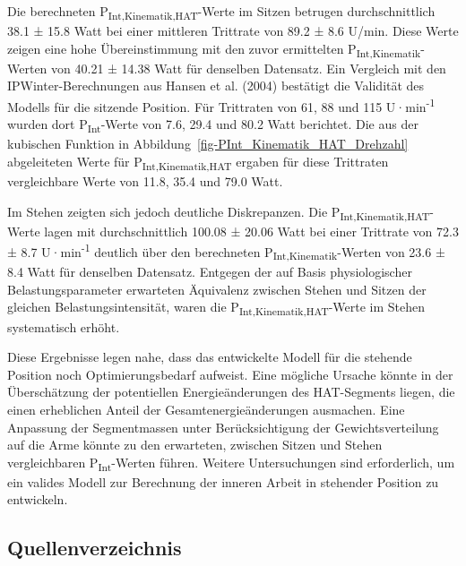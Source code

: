 \documentclass[
  letterpaper,
  DIV=11]{scrartcl}
\begin{document}
Die berechneten P\textsubscript{Int,Kinematik,HAT}-Werte im Sitzen
betrugen durchschnittlich 38.1 ± 15.8 Watt bei einer mittleren Trittrate
von 89.2 ± 8.6 U/min. Diese Werte zeigen eine hohe Übereinstimmung mit
den zuvor ermittelten P\textsubscript{Int,Kinematik}-Werten von 40.21 ±
14.38 Watt für denselben Datensatz. Ein Vergleich mit den
IPWinter-Berechnungen aus Hansen et al. (2004) bestätigt die Validität
des Modells für die sitzende Position. Für Trittraten von 61, 88 und 115
U·min\textsuperscript{-1} wurden dort P\textsubscript{Int}-Werte von
7.6, 29.4 und 80.2 Watt berichtet. Die aus der kubischen Funktion in
Abbildung~\ref{fig-PInt_Kinematik_HAT_Drehzahl} abgeleiteten Werte für
P\textsubscript{Int,Kinematik,HAT} ergaben für diese Trittraten
vergleichbare Werte von 11.8, 35.4 und 79.0 Watt.

Im Stehen zeigten sich jedoch deutliche Diskrepanzen. Die
P\textsubscript{Int,Kinematik,HAT}-Werte lagen mit durchschnittlich
100.08 ± 20.06 Watt bei einer Trittrate von 72.3 ± 8.7
U·min\textsuperscript{-1} deutlich über den berechneten
P\textsubscript{Int,Kinematik}-Werten von 23.6 ± 8.4 Watt für denselben
Datensatz. Entgegen der auf Basis physiologischer Belastungsparameter
erwarteten Äquivalenz zwischen Stehen und Sitzen der gleichen
Belastungsintensität, waren die P\textsubscript{Int,Kinematik,HAT}-Werte
im Stehen systematisch erhöht.

Diese Ergebnisse legen nahe, dass das entwickelte Modell für die
stehende Position noch Optimierungsbedarf aufweist. Eine mögliche
Ursache könnte in der Überschätzung der potentiellen Energieänderungen
des HAT-Segments liegen, die einen erheblichen Anteil der
Gesamtenergieänderungen ausmachen. Eine Anpassung der Segmentmassen
unter Berücksichtigung der Gewichtsverteilung auf die Arme könnte zu den
erwarteten, zwischen Sitzen und Stehen vergleichbaren
P\textsubscript{Int}-Werten führen. Weitere Untersuchungen sind
erforderlich, um ein valides Modell zur Berechnung der inneren Arbeit in
stehender Position zu entwickeln.

\subsection{Quellenverzeichnis}\label{quellenverzeichnis}
\end{document}
